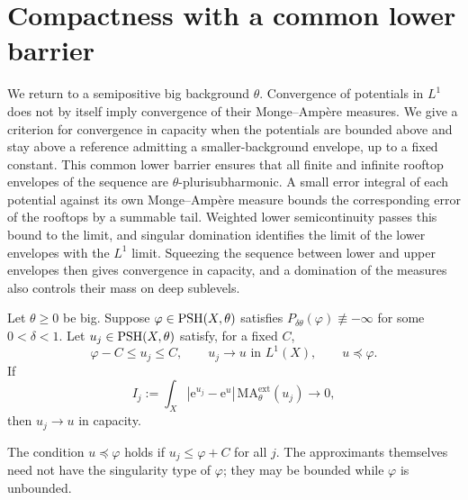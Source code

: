 \section{Compactness with a common lower barrier}

We return to a semipositive big background $\theta$. Convergence of potentials in $L^1$ does not by itself imply convergence of their Monge--Amp\`ere measures. We give a criterion for convergence in capacity when the potentials are bounded above and stay above a reference admitting a smaller-background envelope, up to a fixed constant. This common lower barrier ensures that all finite and infinite rooftop envelopes of the sequence are $\theta$-plurisubharmonic. A small error integral of each potential against its own Monge--Amp\`ere measure bounds the corresponding error of the rooftops by a summable tail. Weighted lower semicontinuity passes this bound to the limit, and singular domination identifies the limit of the lower envelopes with the $L^1$ limit. Squeezing the sequence between lower and upper envelopes then gives convergence in capacity, and a domination of the measures also controls their mass on deep sublevels.

\begin{theorem}\label{thm:common-barrier-criterion}\label{prop:lower-barrier-criterion}
Let $\theta\geq0$ be big. Suppose $\varphi\in\mathrm{PSH}(X,\theta)$ satisfies $P_{\delta\theta}(\varphi)\not\equiv-\infty$ for some $0<\delta<1$. Let $u_j\in\mathrm{PSH}(X,\theta)$ satisfy, for a fixed $C$,
\[
 \varphi-C\leq u_j\leq C,\qquad u_j\longrightarrow u\text{ in }L^1(X),
 \qquad u\preceq\varphi.
\]
If
\begin{equation}\label{eq:common-barrier-self-error}
 I_j:=\int_X|\mathrm{e}^{u_j}-\mathrm{e}^u|\,
               \mathrm{MA}^{\mathrm{ext}}_\theta(u_j)\longrightarrow0,
\end{equation}
then $u_j\to u$ in capacity.
\end{theorem}

The condition $u\preceq\varphi$ holds if $u_j\leq\varphi+C$ for all $j$. The approximants themselves need not have the singularity type of $\varphi$; they may be bounded while $\varphi$ is unbounded.

